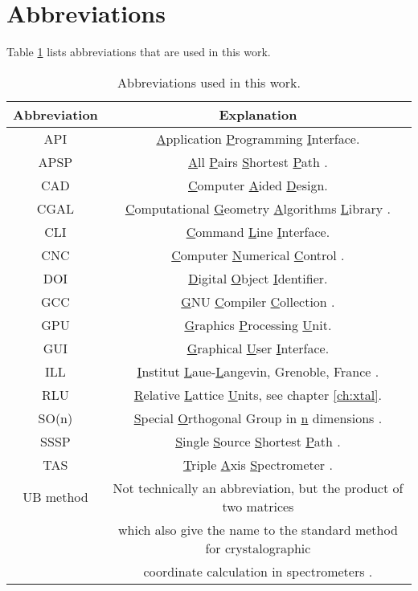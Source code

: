 \section{Abbreviations}
Table \ref{tab:abbreviations} lists abbreviations that are used in this work.

\begin{table}[htb]
	\centering
	\begin{tabular}{|c|c|}
		\hline
		\bf{Abbreviation} & \bf{Explanation} \tabularnewline
		\hline
		API		 & \underline{A}pplication \underline{P}rogramming \underline{I}nterface. \tabularnewline
		\hline
		APSP		 & \underline{A}ll \underline{P}airs \underline{S}hortest \underline{P}ath \cite[pp. 309-320]{Erickson2019}. \tabularnewline
		\hline
		CAD              & \underline{C}omputer \underline{A}ided \underline{D}esign. \tabularnewline
		\hline
		CGAL             & \underline{C}omputational \underline{G}eometry \underline{A}lgorithms \underline{L}ibrary \cite{web_cgal}. \tabularnewline
		\hline
		CLI              & \underline{C}ommand \underline{L}ine \underline{I}nterface. \tabularnewline
		\hline
		CNC              & \underline{C}omputer \underline{N}umerical \underline{C}ontrol \cite{wiki_milling}. \tabularnewline
		\hline
		DOI              & \underline{D}igital \underline{O}bject \underline{I}dentifier. \tabularnewline
		\hline
		GCC              & \underline{G}NU \underline{C}ompiler \underline{C}ollection \cite{web_gcc}. \tabularnewline
		\hline
		GPU              & \underline{G}raphics \underline{P}rocessing \underline{U}nit. \tabularnewline
		\hline
		GUI              & \underline{G}raphical \underline{U}ser \underline{I}nterface. \tabularnewline
		\hline
		ILL              & \underline{I}nstitut \underline{L}aue-\underline{L}angevin, Grenoble, France \cite{web_ill}. \tabularnewline
		\hline
		RLU              & \underline{R}elative \underline{L}attice \underline{U}nits, see chapter \ref{ch:xtal}. \tabularnewline
		\hline
		SO(n)            & \underline{S}pecial \underline{O}rthogonal Group in \underline{n} dimensions \cite[pp. 849-851]{Arfken2013}. \tabularnewline
		\hline
		SSSP		 & \underline{S}ingle \underline{S}ource \underline{S}hortest \underline{P}ath \cite[pp. 273-297]{Erickson2019}. \tabularnewline
		\hline
		TAS              & \underline{T}riple \underline{A}xis \underline{S}pectrometer \cite{Shirane2002}. \tabularnewline
		\hline
		UB method        & Not technically an abbreviation, but the product of two matrices \tabularnewline
		                          & which also give the name to the standard method for crystalographic \tabularnewline
		                          & coordinate calculation in spectrometers \cite{Lumsden2005}. \tabularnewline
		\hline
	\end{tabular}
	\caption[Abbreviations.]{Abbreviations used in this work.}
	\label{tab:abbreviations}
\end{table}
